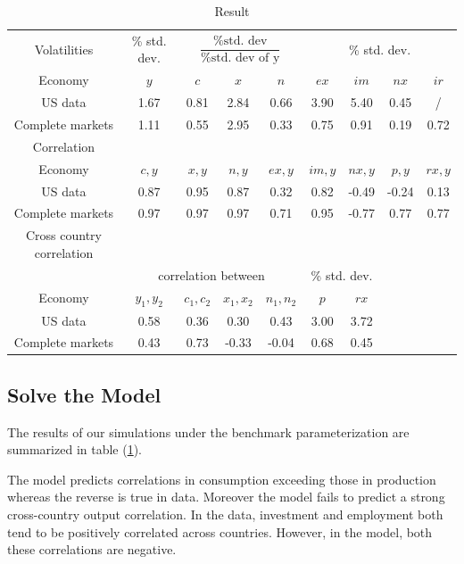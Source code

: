 \documentclass[11pt,a4paper]{article}
\begin{document}
\begin{table}[H]
\begin{center}
\caption{Result}\label{result}
\begin{tabular}{ccccccccc}
\hline
\hline
Volatilities         & \% std. dev.      &   \multicolumn{3}{c}{$\dfrac{\text{\% std. dev}}{\text{\% std. dev of y}}$}    &   \multicolumn{4}{c}{\% std. dev. }             \\
Economy                & $y$   & $c$   & $x$   & $n$    & $ex$   & $im$   & $nx$  & $ir$   \\
\hline
US data                & 1.67  & 0.81  &2.84   &  0.66  & 3.90     &  5.40   & 0.45      &  /    \\
Complete markets       &  1.11    &  0.55     & 2.95  &  0.33 & 0.75 & 0.91 & 0.19      &   0.72     \\
\hline
\hline
Correlation&&&&&&&&\\

Economy & $c,y$ & $x,y$ & $n,y$ & $ex,y$ & $im,y$ & $nx,y$ & $p,y$ & $rx,y$ \\
\hline
US data            &  0.87 & 0.95  & 0.87 & 0.32 &   0.82 & -0.49 & -0.24 & 0.13       \\
Complete markets   &  0.97 & 0.97  & 0.97 & 0.71 & 0.95& -0.77&0.77&   0.77     \\
\hline
\hline
Cross country correlation& \\
&\multicolumn{4}{c}{correlation between}  & \multicolumn{2}{c}{\% std. dev. } \\
Economy & $y_1,y_2$ & $c_1,c_2$ & $x_1,x_2$ & $n_1,n_2$ & $p$ & $rx$ \\
\hline
US data            &  0.58 & 0.36  & 0.30 & 0.43 &   3.00 & 3.72 &      \\
Complete markets   &  0.43    &  0.73     &   -0.33    &   -0.04     &    0.68    &0.45                \\
\hline
\hline
\end{tabular}							
\end{center}
\end{table}
\subsection{Solve the Model}
The results of our simulations under the benchmark parameterization are
summarized in table (\ref{result}).

The model predicts correlations in consumption exceeding those in production
whereas the reverse is true in data. Moreover the model fails to
predict a strong cross-country output correlation. In the data, investment and
employment both tend to be positively correlated across countries. However, in the model, both these correlations are negative. 
\end{document}
